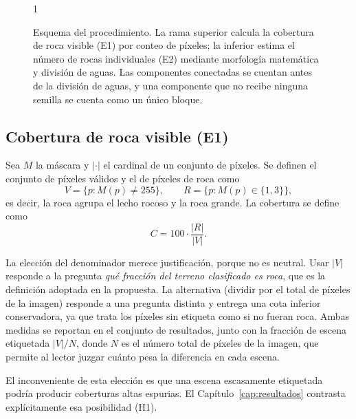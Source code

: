 \begin{figure}[htbp]
\begin{spacing}{1}
  \end{spacing}
  \caption[Esquema del procedimiento de cálculo]{Esquema del procedimiento. La rama
    superior calcula la cobertura de roca visible (E1) por conteo de píxeles; la inferior
    estima el número de rocas individuales (E2) mediante morfología matemática y división
    de aguas. Las componentes conectadas se cuentan antes de la división de aguas, y una
    componente que no recibe ninguna semilla se cuenta como un único bloque.}
  \label{fig:esquema-metodo}
\end{figure}

\subsection{Cobertura de roca visible (E1)}

Sea $M$ la máscara y $|\cdot|$ el cardinal de un conjunto de píxeles. Se definen el
conjunto de píxeles válidos y el de píxeles de roca como
\[
  V = \{p : M(p) \neq 255\},
  \qquad
  R = \{p : M(p) \in \{1, 3\}\},
\]
es decir, la roca agrupa el lecho rocoso y la roca grande. La cobertura se define como
\begin{equation}
  C = 100 \cdot \frac{|R|}{|V|}.
  \label{eq:cobertura}
\end{equation}

La elección del denominador merece justificación, porque no es neutral. Usar $|V|$
responde a la pregunta \textit{qué fracción del terreno clasificado es roca}, que es la
definición adoptada en la propuesta. La alternativa (dividir por el total de píxeles de la
imagen) responde a una pregunta distinta y entrega una cota inferior conservadora, ya que
trata los píxeles sin etiqueta como si no fueran roca. Ambas medidas se reportan en el
conjunto de resultados, junto con la fracción de escena etiquetada $|V|/N$, donde $N$ es el
número total de píxeles de la imagen, que permite al lector juzgar cuánto pesa la diferencia en
cada escena.

El inconveniente de esta elección es que una escena escasamente etiquetada podría producir
coberturas altas espurias. El Capítulo~\ref{cap:resultados} contrasta explícitamente esa
posibilidad (H1).

